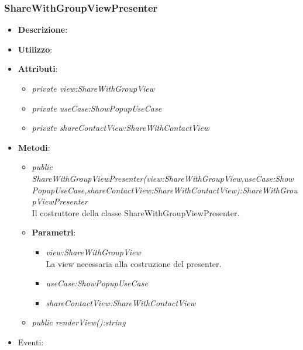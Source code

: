 \subsubsection{ShareWithGroupViewPresenter}
\begin{itemize}
\item \textbf{Descrizione}: 
\item \textbf{Utilizzo}:
\item \textbf{Attributi}: 
	\begin{itemize}
	\item \textit{private view:ShareWithGroupView}\\
	
	\item \textit{private useCase:ShowPopupUseCase}\\
		
	\item \textit{private shareContactView:ShareWithContactView}\\
	\end{itemize} 
\item \textbf{Metodi}:
	\begin{itemize}
	\item \textit{public ShareWithGroupViewPresenter(view:ShareWithGroupView,useCase:ShowPopupUseCase,shareContactView:ShareWithContactView):ShareWithGroupViewPresenter}\\
	Il costruttore della classe ShareWithGroupViewPresenter.
			\item{\textbf{Parametri}: \begin{itemize}
			\item \textit{view:ShareWithGroupView}\\
			La view necessaria alla costruzione del presenter.
			\item \textit{useCase:ShowPopupUseCase}\\
			
			\item \textit{shareContactView:ShareWithContactView}\\
						
			\end{itemize}}
	\item \textit{public renderView():string}\\

	\end{itemize}
\item{Eventi}:
\end{itemize}